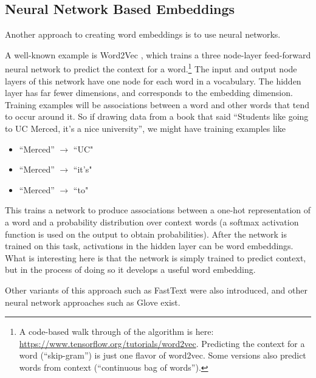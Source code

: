 \subsection{Neural Network Based Embeddings}

Another approach to creating word embeddings is to use neural networks.

A well-known example is Word2Vec \cite{mikolov2013distributed}, which trains a three node-layer feed-forward neural network to predict the context for a word.\footnote{A code-based walk through of the algorithm is here: \url{https://www.tensorflow.org/tutorials/word2vec}. Predicting the context for a word (``skip-gram'') is just one flavor of word2vec. Some versions also predict words from context (``continuous bag of words''). }  The input and output node layers of this network have one node for each word in a vocabulary.  The hidden layer has far fewer dimensions, and corresponds to the embedding dimension.  Training examples will be associations between a word and other words that tend to occur around it.  So if drawing data from a book that said ``Students like going to UC Merced, it's a nice university'', we might have training examples like 
\begin{itemize}
\item ``Merced'' $\longrightarrow$ ``UC"
\item ``Merced'' $\longrightarrow$ ``it's"
\item ``Merced'' $\longrightarrow$ ``to"
\end{itemize}
This trains a network to produce associations between a one-hot representation of a word and a probability distribution over context words (a softmax activation function is used on the output to obtain probabilities). After the network is trained on this task, activations in the hidden layer can be word embeddings. What is interesting here is that the network is simply trained to predict context, but in the process of doing so it develops a useful word embedding. 

Other variants of this approach such as FastText were also introduced, and other neural network approaches such as Glove exist. 

